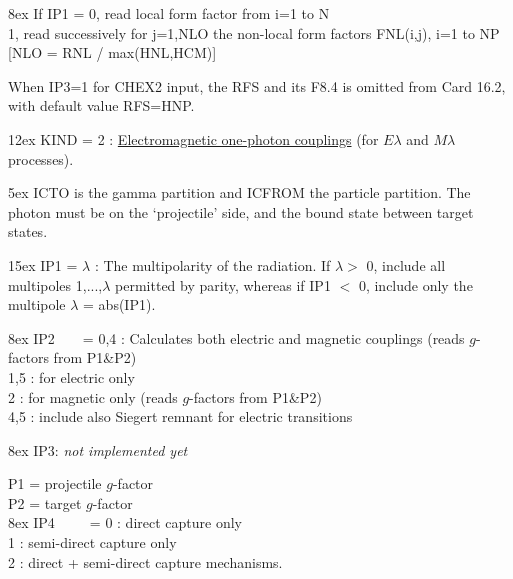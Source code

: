 \documentclass[11pt]{article}
\begin{document}
\hangindent 8ex  If IP1 =
      0, read local form factor from i=1 to N
\\  1, read successively for j=1,NLO the non-local form factors
 FNL(i,j), i=1 to NP   [NLO = RNL / max(HNL,HCM)]


When IP3=1 for CHEX2 input, the RFS and its F8.4 is omitted from Card 16.2,
with default value RFS=HNP.
\bigskip


\hangindent 12ex
KIND = 2 :
\underline{Electromagnetic one-photon couplings} (for $E\lambda$ and
$M\lambda$ processes).


\hangindent 5ex
 ICTO is the gamma partition and ICFROM the particle partition.
 The photon must be on the `projectile' side, and the bound state between
 target states.

\hangindent 15ex
 IP1 = $\lambda$ : The multipolarity of the radiation.
 If $\lambda >$ 0, include all multipoles 1,...,$\lambda$
permitted by parity, whereas if IP1 $<$ 0, include only the multipole
$\lambda$ = abs(IP1).
%

\hangindent 8ex  IP2
~ ~   = 0,4 : Calculates both electric and magnetic couplings
(reads $g$-factors from P1\&P2)
\\    1,5 : for electric only
\\    2 : for magnetic only (reads $g$-factors from P1\&P2)
\\    4,5 : include also Siegert remnant for electric transitions


\hangindent 8ex  IP3:  {\em not implemented yet}


 P1  = projectile $g$-factor  \\
 P2  = target $g$-factor  \\

\hangindent 8ex  IP4 
~  ~~   = 0 : direct capture only
\\    1 : semi-direct capture only
\\    2 : direct + semi-direct capture mechanisms.

\bigskip
\end{document}

